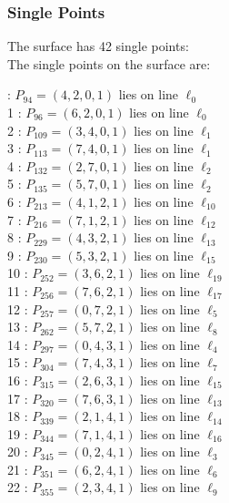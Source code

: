 \documentclass{article}
\begin{document}
{\subsubsection*{Single Points}
The surface has 42 single points:\\
The single points on the surface are:\\
\begin{multicols}{2}
 : $P_{94}=( 4, 2, 0, 1 )$ lies on line $\ell_{0}$\\
1 : $P_{96}=( 6, 2, 0, 1 )$ lies on line $\ell_{0}$\\
2 : $P_{109}=( 3, 4, 0, 1 )$ lies on line $\ell_{1}$\\
3 : $P_{113}=( 7, 4, 0, 1 )$ lies on line $\ell_{1}$\\
4 : $P_{132}=( 2, 7, 0, 1 )$ lies on line $\ell_{2}$\\
5 : $P_{135}=( 5, 7, 0, 1 )$ lies on line $\ell_{2}$\\
6 : $P_{213}=( 4, 1, 2, 1 )$ lies on line $\ell_{10}$\\
7 : $P_{216}=( 7, 1, 2, 1 )$ lies on line $\ell_{12}$\\
8 : $P_{229}=( 4, 3, 2, 1 )$ lies on line $\ell_{13}$\\
9 : $P_{230}=( 5, 3, 2, 1 )$ lies on line $\ell_{15}$\\
10 : $P_{252}=( 3, 6, 2, 1 )$ lies on line $\ell_{19}$\\
11 : $P_{256}=( 7, 6, 2, 1 )$ lies on line $\ell_{17}$\\
12 : $P_{257}=( 0, 7, 2, 1 )$ lies on line $\ell_{5}$\\
13 : $P_{262}=( 5, 7, 2, 1 )$ lies on line $\ell_{8}$\\
14 : $P_{297}=( 0, 4, 3, 1 )$ lies on line $\ell_{4}$\\
15 : $P_{304}=( 7, 4, 3, 1 )$ lies on line $\ell_{7}$\\
16 : $P_{315}=( 2, 6, 3, 1 )$ lies on line $\ell_{15}$\\
17 : $P_{320}=( 7, 6, 3, 1 )$ lies on line $\ell_{13}$\\
18 : $P_{339}=( 2, 1, 4, 1 )$ lies on line $\ell_{14}$\\
19 : $P_{344}=( 7, 1, 4, 1 )$ lies on line $\ell_{16}$\\
20 : $P_{345}=( 0, 2, 4, 1 )$ lies on line $\ell_{3}$\\
21 : $P_{351}=( 6, 2, 4, 1 )$ lies on line $\ell_{6}$\\
22 : $P_{355}=( 2, 3, 4, 1 )$ lies on line $\ell_{9}$\\

\end{multicols}}
\end{document}
